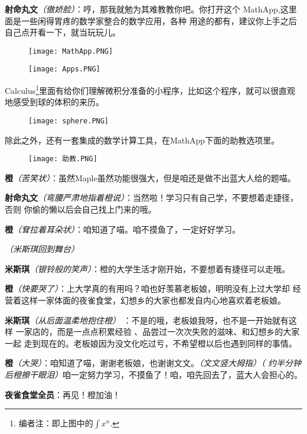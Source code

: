 \textbf{射命丸文}\textit{（傲娇脸）}：哼，那我就勉为其难教教你吧。你打开这个
MathApp,这里面是一些闲得胃疼的数学家整合的数学应用，各种
用途的都有，建议你上手之后自己点开看一下，就当玩玩儿。
%
\begin{figure}[h]
    \centering
    \texttt{[image: MathApp.PNG]}
\end{figure}
\begin{figure}[h]
    \centering
    \texttt{[image: Apps.PNG]}
\end{figure}

Calculus\footnote{编者注：即上图中的$\int
        x^n$.}里面有给你们理解微积分准备的小程序，比如这个程序，就可以很直观地感受到球的体积的来历。
%
\begin{figure}[htpb]
    \centering
    \texttt{[image: sphere.PNG]}
\end{figure}

除此之外，还有一套集成的数学计算工具，在MathApp下面的助教选项里。%
\begin{figure}[htpb]
    \centering
    \texttt{[image: 助教.PNG]}
\end{figure}

\textbf{橙}\textit{（苦笑状）}：虽然Maple虽然功能很强大，但是咱还是做不出蓝大人给的题喵。

\textbf{射命丸文}\textit{（弯腰严肃地指着橙说）}：当然啦！学习只有自己学，不要想着走捷径，否则
你偷的懒以后会自己找上门来的哦。

\textbf{橙}\textit{（耷拉着耳朵状）}：咱知道了喵。咱不摸鱼了，一定好好学习。

\textit{（米斯琪回到舞台）}

\textbf{米斯琪}\textit{（银铃般的笑声）}：橙的大学生活才刚开始，不要想着有捷径可以走哦。

\textbf{橙}\textit{（快要哭了）}：上大学真的有用吗？咱也好羡慕老板娘，明明没有上过大学却
经营着这样一家体面的夜雀食堂，幻想乡的大家也都发自内心地喜欢着老板娘。

\textbf{米斯琪}\textit{（从后面温柔地抱住橙）}%
：不是的哦，老板娘我呀，也不是一开始就有这样
一家店的，而是一点点积累经验%
、品尝过一次次失败的滋味、和幻想乡的大家一起
走到现在的。老板娘因为没文化吃过亏，不希望橙以后也遇到同样的事情。

\textbf{橙}\textit{（大哭）}：咱知道了喵，谢谢老板娘，也谢谢文文。\textit{（文文竖大拇指）（
    约半分钟后橙擦干眼泪）}咱一定努力学习，不摸鱼了！咱，咱先回去了，蓝大人会担心的。

\textbf{夜雀食堂全员}：再见！橙加油！

